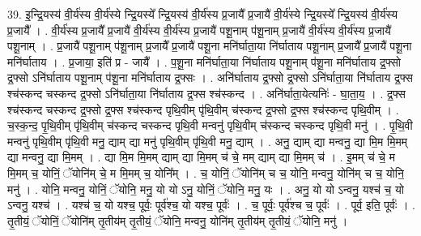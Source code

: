 \documentclass[17pt]{extarticle}
\begin{document}
39. इ॒न्द्रि॒यस्य॑ वी॒र्य॑स्य वी॒र्य॑स्ये न्द्रि॒यस्ये᳚ न्द्रि॒यस्य॑ वी॒र्य॑स्य प्र॒जायै᳚ प्र॒जायै॑ वी॒र्य॑स्ये न्द्रि॒यस्ये᳚ न्द्रि॒यस्य॑ वी॒र्य॑स्य प्र॒जायै᳚ । . वी॒र्य॑स्य प्र॒जायै᳚ प्र॒जायै॑ वी॒र्य॑स्य वी॒र्य॑स्य प्र॒जायै॑ पशू॒नाम् प॑शू॒नाम् प्र॒जायै॑ वी॒र्य॑स्य वी॒र्य॑स्य प्र॒जायै॑ पशू॒नाम् । . प्र॒जायै॑ पशू॒नाम् प॑शू॒नाम् प्र॒जायै᳚ प्र॒जायै॑ पशू॒ना मनि॑र्घाता॒या नि॑र्घाताय पशू॒नाम् प्र॒जायै᳚ प्र॒जायै॑ पशू॒ना मनि॑र्घाताय । . प्र॒जाया॒ इति॑ प्र - जायै᳚ । . प॒शू॒ना मनि॑र्घाता॒या नि॑र्घाताय पशू॒नाम् प॑शू॒ना मनि॑र्घाताय द्र॒फ्सो द्र॒फ्सो ऽनि॑र्घाताय पशू॒नाम् प॑शू॒ना मनि॑र्घाताय द्र॒फ्सः । . अनि॑र्घाताय द्र॒फ्सो द्र॒फ्सो ऽनि॑र्घाता॒या नि॑र्घाताय द्र॒फ्स श्च॑स्कन्द चस्कन्द द्र॒फ्सो ऽनि॑र्घाता॒या नि॑र्घाताय द्र॒फ्स श्च॑स्कन्द । . अनि॑र्घाता॒येत्यनिः॑ - घा॒ता॒य॒ । . द्र॒फ्स श्च॑स्कन्द चस्कन्द द्र॒फ्सो द्र॒फ्स श्च॑स्कन्द पृथि॒वीम् पृ॑थि॒वीम् च॑स्कन्द द्र॒फ्सो द्र॒फ्स श्च॑स्कन्द पृथि॒वीम् । . च॒स्क॒न्द॒ पृ॒थि॒वीम् पृ॑थि॒वीम् च॑स्कन्द चस्कन्द पृथि॒वी मन्वनु॑ पृथि॒वीम् च॑स्कन्द चस्कन्द पृथि॒वी मनु॑ । . पृ॒थि॒वी मन्वनु॑ पृथि॒वीम् पृ॑थि॒वी मनु॒ द्याम् द्या मनु॑ पृथि॒वीम् पृ॑थि॒वी मनु॒ द्याम् । . अनु॒ द्याम् द्या मन्वनु॒ द्या मि॒म मि॒मम् द्या मन्वनु॒ द्या मि॒मम् । . द्या मि॒म मि॒मम् द्याम् द्या मि॒मम् च॑ चे॒ मम् द्याम् द्या मि॒मम् च॑ । . इ॒मम् च॑ चे॒ म मि॒मम् च॒ योनिं॒ ॅयोनि॑म् चे॒ म मि॒मम् च॒ योनि᳚म् । . च॒ योनिं॒ ॅयोनि॑म् च च॒ योनि॒ मन्वनु॒ योनि॑म् च च॒ योनि॒ मनु॑ । . योनि॒ मन्वनु॒ योनिं॒ ॅयोनि॒ मनु॒ यो यो ऽनु॒ योनिं॒ ॅयोनि॒ मनु॒ यः । . अनु॒ यो यो ऽन्वनु॒ यश्च॑ च॒ यो ऽन्वनु॒ यश्च॑ । . यश्च॑ च॒ यो यश्च॒ पूर्वः॒ पूर्व॑श्च॒ यो यश्च॒ पूर्वः॑ । . च॒ पूर्वः॒ पूर्व॑श्च च॒ पूर्वः॑ । . पूर्व॒ इति॒ पूर्वः॑ । . तृ॒तीयं॒ ॅयोनिं॒ ॅयोनि॑म् तृ॒तीय॑म् तृ॒तीयं॒ ॅयोनि॒ मन्वनु॒ योनि॑म् तृ॒तीय॑म् तृ॒तीयं॒ ॅयोनि॒ मनु॑ । \newline
\end{document}
